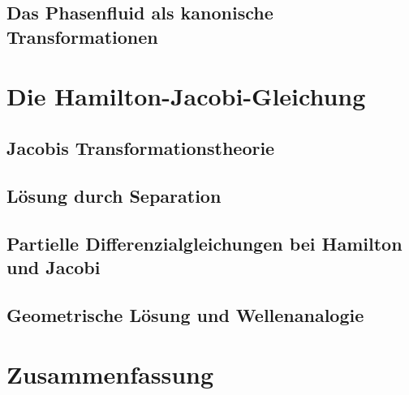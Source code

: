 \documentclass{beamer}
\begin{document}
    \subsection{Das Phasenfluid als kanonische Transformationen}
    
    
\section{Die Hamilton-Jacobi-Gleichung}

    \subsection{Jacobis Transformationstheorie}
    
    \subsection{Lösung durch Separation}
    
    \subsection{Partielle Differenzialgleichungen bei Hamilton und Jacobi}

    \subsection{Geometrische Lösung und Wellenanalogie}

\section{Zusammenfassung}
\end{document}
